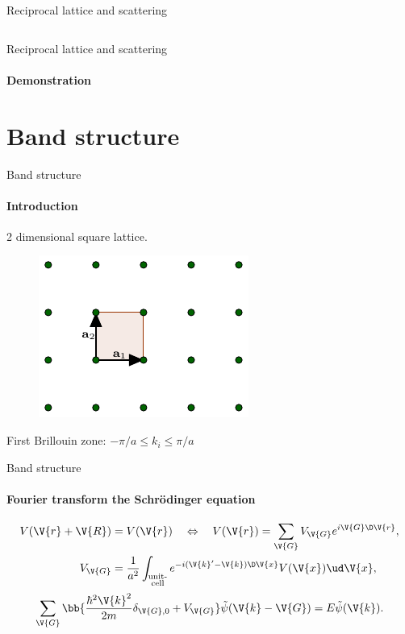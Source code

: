 \documentclass{beamer}
\begin{document}
\begin{frame}{Reciprocal lattice and scattering}
\begin{columns}
\begin{column}{0.25\textwidth}
	\end{column}
\end{columns}
\end{frame}

\begin{frame}{Reciprocal lattice and scattering}
\framesubtitle{Demonstration}
\end{frame}


\section{Band structure}
\begin{frame}{Band structure}
	\framesubtitle{Introduction}
	2 dimensional square lattice.
	\begin{figure}[H]
		\centering
		\includegraphics[width=0.5\linewidth]{figures/squareUnit.pdf}
		\label{fig:band_structure_lattice}
	\end{figure}
	\pause
	First Brillouin zone: $ -\pi/a \leq k_i \leq \pi/a $
\end{frame}

\begin{frame}{Band structure}
\framesubtitle{Fourier transform the Schrödinger equation}
\begin{align*}
	V(\V{r}+\V{R}) &= V(\V{r}) \quad \Leftrightarrow \quad V(\V{r}) = \sum_{\V{G}} V_{\V{G}} e^{i\V{G} \D \V{r}},\\
	V_{\V{G}} &= \frac{1}{a^2}\int_{\substack{\text{unit-} \\\text{cell}}} e^{-i (\V{k}'-\V{k}) \D \V{x}} V(\V{x}) \ud \V{x},
\end{align*}
\pause
\begin{equation*}\label{key}
	\sum_{\V{G}} \bb{\frac{\hbar^2 \V{k}^2}{2m} \delta_{\V{G},0} + V_{\V{G}} } \tilde{\psi}(\V{k}-\V{G}) = E \tilde{\psi} (\V{k}).
\end{equation*}
\end{frame}
\end{document}
